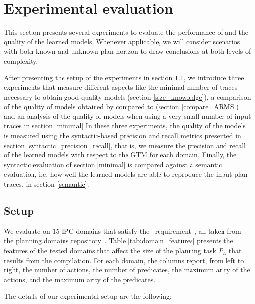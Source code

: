 
\section{Experimental evaluation}
\label{sec:experiments}

This section presents several experiments to evaluate the performance of \FAMA and the quality of the learned models. Whenever applicable, we will consider scenarios with both known and unknown plan horizon to draw conclusions at both levels of complexity.

\textcolor[rgb]{1.00,0.00,0.00}{After presenting the setup of the experiments in section \ref{setup}, we introduce three experiments that measure different aspects like the minimal number of traces necessary to obtain good quality models (section \ref{size_knowledge}), a comparison of the quality of models obtained by \FAMA compared to \ARMS (section \ref{compare_ARMS}) and an analysis of the quality of models when using a very small number of input traces in section \ref{minimal} In these three experiments, the quality of the models is measured using the syntactic-based precision and recall metrics presented in section \ref{syntactic_precision_recall}, that is, we measure the precision and recall of the learned models with respect to the GTM for each domain. Finally, the syntactic evaluation of section \ref{minimal} is compared against a semantic evaluation, i.e. how well the learned models are able to reproduce the input plan traces, in section \ref{semantic}.}



\subsection{Setup}
\label{setup}

We evaluate \FAMA on 15 IPC domains that satisfy the \strips\ requirement~\cite{fox2003pddl2}, all taken from the {\sc planning.domains} repository~\cite{muise2016planning}. Table \ref{tab:domain_features} presents the features of the tested domains that affect the size of the planning task $P_\Lambda$ that results from the compilation. For each domain, the columns report, from left to right, the number of actions, the number of predicates, the maximum arity of the actions, and the maximum arity of the predicates.

The details of our experimental setup are the following:

